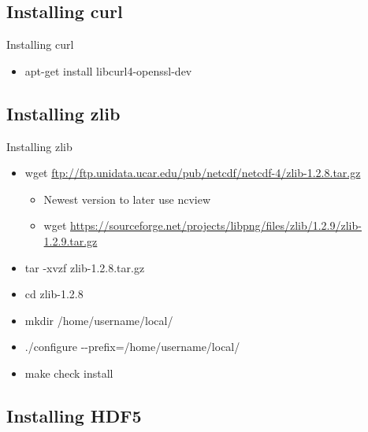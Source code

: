 \documentclass[compress,11pt,xcolor=svgnames,aspectratio=169]{beamer}
\begin{document}
\subsection{Installing curl}

\begin{frame}[fragile]{Installing curl}

\begin{itemize}

  \item apt-get install libcurl4-openssl-dev

\end{itemize}

\end{frame}

\subsection{Installing zlib}

\begin{frame}[fragile]{Installing zlib}

\begin{itemize}
\setlength\itemsep{0.3cm}

  \item wget \url{ftp://ftp.unidata.ucar.edu/pub/netcdf/netcdf-4/zlib-1.2.8.tar.gz}
  \begin{itemize}
    \item Newest version to later use ncview
    \item wget \url{https://sourceforge.net/projects/libpng/files/zlib/1.2.9/zlib-1.2.9.tar.gz}
  \end{itemize}
  \item tar -xvzf zlib-1.2.8.tar.gz
  \item cd zlib-1.2.8
  \item mkdir /home/username/local/
  \item ./configure {-}{-}prefix=/home/username/local/
  \item make check install

\end{itemize}

\end{frame}

\subsection{Installing HDF5}
\end{document}
